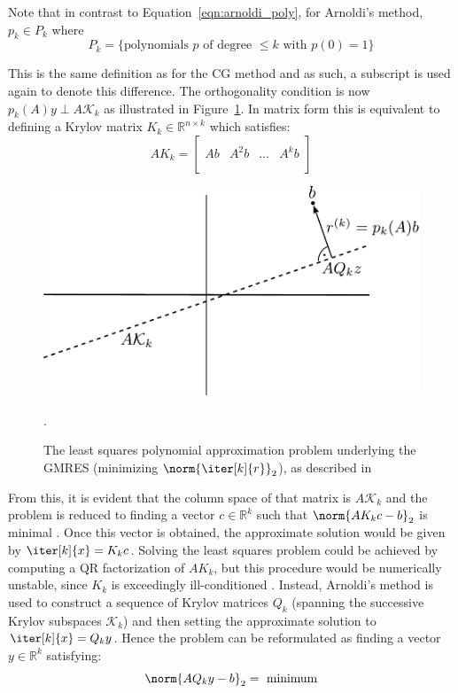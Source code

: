 \noindent Note that in contrast to Equation~\hyperref[eqn:arnoldi_poly]{\ref{eqn:arnoldi_poly}}, for Arnoldi's method, $p_k \in P_k$ where
\begin{equation}
    P_k = \{\text{polynomials } p \text{ of degree } \leq k \text{ with }p(0)=1\}
\end{equation}

\noindent This is the same definition as for the CG method and as such, a subscript is used again to denote this difference. The orthogonality condition is now $p_k(A)y \perp A\mathcal{K}_k$ as illustrated in Figure~\hyperref[fig:gmres]{\ref{fig:gmres}}. In matrix form this is equivalent to defining a Krylov matrix $K_k \in \mathbb{R}^{n \times k}$ which satisfies:
\begin{equation}
\label{eqn:krylov_matrix}
  AK_k =
  \left[
    \begin{array}{c|c|c|c}
      & & & \\
      Ab & A^2b & \dots & A^kb \\
      & & & \\
    \end{array}
  \right] 
\end{equation}

\begin{figure}[h]
    \centering
    \includegraphics[width=0.7\linewidth]{chapters/2_solvers/2_3_iterative_solvers/figures/GMRES.pdf}
    \caption{The least squares polynomial approximation problem underlying the GMRES (minimizing $\norm{\iter[k]{r}}_2$), as described in \cite{trefethen_numerical_1997}}.
    \label{fig:gmres}
\end{figure}

\noindent From this, it is evident that the column space of that matrix is $A\mathcal{K}_k$ and the problem is reduced to finding a vector $c \in \mathbb{R}^{k}$ such that $\norm{AK_kc-b}_2$ is minimal   \cite{trefethen_numerical_1997}. Once this vector is obtained, the approximate solution would be given by $\iter[k]{x} =K_kc$. Solving the least squares problem could be achieved by computing a QR factorization of $AK_k$, but this procedure would be numerically unstable, since $K_k$ is exceedingly ill-conditioned \cite{trefethen_numerical_1997}. Instead, Arnoldi's method is used to construct a sequence of Krylov matrices $Q_k$ (spanning the successive Krylov subspaces $\mathcal{K}_k$) and then setting the approximate solution to $\iter[k]{x} = Q_ky$. Hence the problem can be reformulated as finding a vector $y \in \mathbb{R}^k$ satisfying:
\begin{equation}
    \norm{AQ_ky-b}_2=\text{ minimum}
\end{equation}

